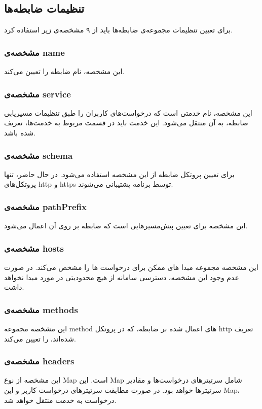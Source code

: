 \subsection*{تنظیمات ضابطه‌ها}
برای تعیین تنظیمات مجموعه‌ی ضابطه‌ها باید از ۹ مشخصه‌ی زیر استفاده کرد.


\subsubsection*{مشخصه‌ی name}
این مشخصه، نام ضابطه را تعیین می‌کند.

\subsubsection*{مشخصه‌ی service}
این مشخصه، نام خدمتی است که درخواست‌های کاربران را طبق تنظیمات مسیر‌یابی ضابطه، به آن منتقل می‌شود. این خدمت باید در قسمت مربوط به خدمت‌ها، تعریف شده باشد.

\subsubsection*{مشخصه‌ی schema}
برای تعیین پروتکل ضابطه از این مشخصه استفاده می‌شود. در حال حاضر، تنها پروتکل‌های http و https توسط برنامه پشتیبانی می‌شوند.

\subsubsection*{مشخصه‌ی pathPrefix}
این مشخصه برای تعیین پیش‌مسیرهایی است که ضابطه بر روی آن اعمال می‌شود.

\subsubsection*{مشخصه‌ی hosts}
این مشخصه مجموعه مبدا‌ های ممکن برای درخواست ها را مشخص می‌کند. در صورت عدم وجود این مشخصه،‌ دسترسی سامانه از هیچ محدودیتی در مورد مبدا نخواهد داشت.

\subsubsection*{مشخصه‌ی methods}
این مشخصه مجموعه method های اعمال شده بر ضابطه، که در پروتکل http تعریف شده‌اند، را تعیین می‌کند.

\subsubsection*{مشخصه‌ی headers}
این مشخصه از نوع Map است. این Map شامل سرتیتر‌های درخواست‌ها و مقادیر سرتیتر‌ها خواهد بود. در صورت مطابقت سرتیتر‌های درخواست کاربر و این Map، درخواست به خدمت منتقل خواهد شد.

